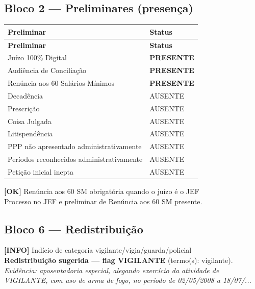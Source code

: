 \documentclass[12pt,a4paper]{article}
\newcommand{\statusOK}[1]{\textcolor{corOK}{\textbf{[OK]}} #1}
\newcommand{\statusINFO}[1]{\textcolor{corINFO}{\textbf{[INFO]}} #1}
\begin{document}
\subsection{Bloco 2 --- Preliminares (presença)}

\begin{longtable}{p{8.5cm} p{4.5cm}}
  \toprule
  \textbf{Preliminar} & \textbf{Status} \\
  \midrule
  \endfirsthead
  \toprule
  \textbf{Preliminar} & \textbf{Status} \\
  \midrule
  \endhead
  Juízo 100\% Digital                           & \textcolor{corOK}{\textbf{PRESENTE}} \\
  Audiência de Conciliação                      & \textcolor{corOK}{\textbf{PRESENTE}} \\
  Renúncia aos 60 Salários-Mínimos              & \textcolor{corOK}{\textbf{PRESENTE}} \\
  Decadência                                    & AUSENTE \\
  Prescrição                                    & AUSENTE \\
  Coisa Julgada                                 & AUSENTE \\
  Litispendência                                & AUSENTE \\
  PPP não apresentado administrativamente       & AUSENTE \\
  Períodos reconhecidos administrativamente     & AUSENTE \\
  Petição inicial inepta                        & AUSENTE \\
  \bottomrule
\end{longtable}

\statusOK{Renúncia aos 60 SM obrigatória quando o juízo é o JEF}\\
Processo no JEF e preliminar de Renúncia aos 60 SM presente.

\subsection{Bloco 6 --- Redistribuição}

\statusINFO{Indício de categoria vigilante/vigia/guarda/policial}\\
\textcolor{corVERIFICAR}{\textbf{Redistribuição sugerida --- flag VIGILANTE}} (termo(s): vigilante).
\\
\textit{Evidência: aposentadoria especial, alegando exercício da atividade de VIGILANTE, com uso de arma de fogo, no período de 02/05/2008 a 18/07/...}
\end{document}
